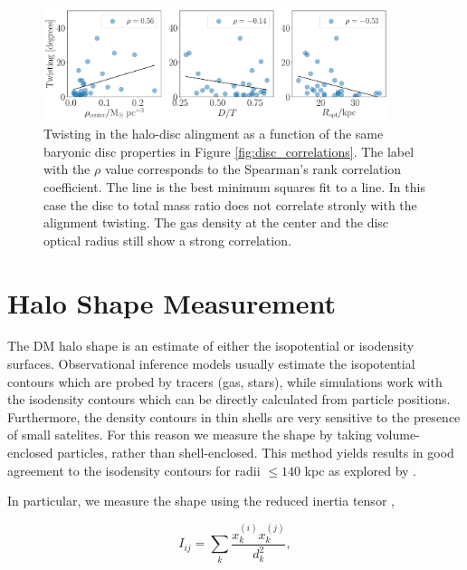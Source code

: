 \documentclass[usenatbib]{mnras}
\begin{document}
\begin{figure}
\begin{center}
\includegraphics[width=0.9\textwidth]{correlations_angles_alignment_MHD.pdf}
\end{center}
\caption{Twisting in the halo-disc alingment as a function of the same
  baryonic disc properties in Figure \ref{fig:disc_correlations}.
  The label with the $\rho$ value corresponds to the Spearman's rank
  correlation coefficient.
  The line is the best minimum squares fit to a line.
  In this case the disc to total mass ratio does not correlate stronly
  with the alignment twisting.
  The gas density at the center and the disc optical radius still show
  a strong correlation.}
\label{fig:alignment_correlations}
\end{figure}




\section{Halo Shape Measurement}
\label{sec:method}

The DM halo shape is an estimate of either the isopotential or
isodensity surfaces.   
Observational inference models usually estimate the 
isopotential contours which are probed by tracers (gas, stars), while
simulations work with the isodensity contours which can be directly
calculated from particle positions.  
Furthermore, the density contours in thin shells are very sensitive to
the presence of small satelites.  
For this reason we measure the shape by taking
volume-enclosed particles, rather than shell-enclosed.  
This method yields results in good agreement to the isodensity
contours for radii $\leq 140$ kpc as explored by
\citep{VeraCiro11}.  


In particular, we measure the shape using the reduced inertia tensor
\citep{Allgood06},  

\begin{equation}
I_{ij} = \sum_k \frac{x_k^{(i)}x_k^{(j)}}{d^2_k},
\label{eq:inertia}
\end{equation}
\end{document}
